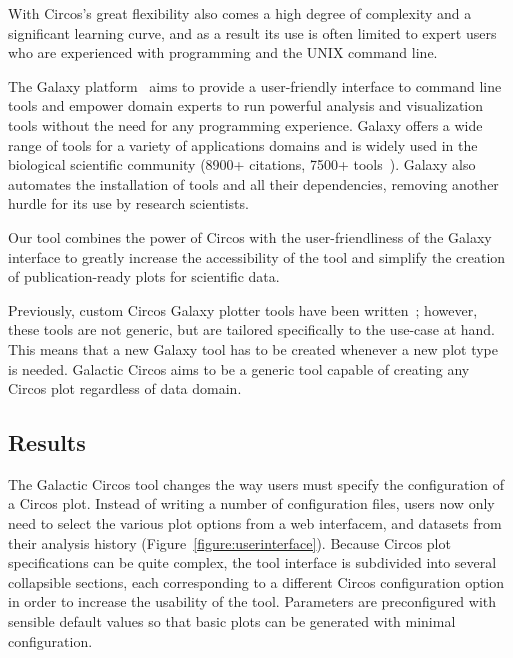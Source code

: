With Circos's great flexibility also comes a high degree of complexity and a significant learning curve, and as a result its use is often limited to expert users who are experienced with programming and the UNIX command line.

The Galaxy platform~\cite{afgan2018galaxy} aims to provide a user-friendly interface to command line tools and empower domain experts to run powerful analysis and visualization tools without the need for any programming experience. Galaxy offers a wide range of tools for a variety of applications domains and is widely used in the biological scientific community (8900+ citations, 7500+ tools~\cite{galaxycitations,galaxytoolshed}). Galaxy also automates the installation of tools and all their dependencies, removing another hurdle for its use by research scientists.

Our tool combines the power of Circos with the user-friendliness of the Galaxy interface to greatly increase the accessibility of the tool and simplify the creation of publication-ready plots for scientific data.

Previously, custom Circos Galaxy plotter tools have been written~\cite{hiltemann2014cgtag}; however, these tools are not generic, but are tailored specifically to the use-case at hand. This means that a new Galaxy tool has to be created whenever a new plot type is needed. Galactic Circos aims to be a generic tool capable of creating any Circos plot regardless of data domain.

\subsection*{Results}
The Galactic Circos tool changes the way users must specify the configuration of a Circos plot. Instead of writing a number of configuration files, users now only need to select the various plot options from a web interfacem, and datasets from their analysis history (Figure~\ref{figure:userinterface}). Because Circos plot specifications can be quite complex, the tool interface is subdivided into several collapsible sections, each corresponding to a different Circos configuration option in order to increase the usability of the tool. Parameters are preconfigured with sensible default values so that basic plots can be generated with minimal configuration.

